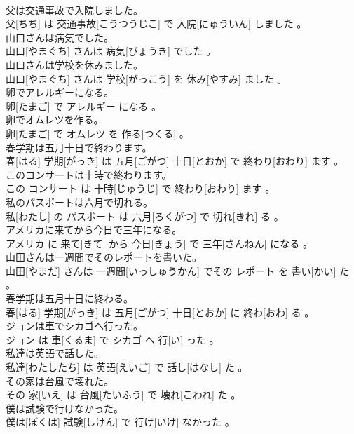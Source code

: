 \documentclass[8pt]{extreport}
\begin{document}
\begin{CJK}{UTF8}{min}
\\	父は交通事故で入院しました。	
\\	父[ちち] は 交通事故[こうつうじこ] で 入院[にゅういん] しました 。
\\	山口さんは病気でした。	
\\	山口[やまぐち] さんは 病気[びょうき] でした 。
\\	山口さんは学校を休みました。	
\\	山口[やまぐち] さんは 学校[がっこう] を 休み[やすみ] ました 。
\\	卵でアレルギーになる。	
\\	卵[たまご] で アレルギー になる 。
\\	卵でオムレツを作る。	
\\	卵[たまご] で オムレツ を 作る[つくる] 。
\\	春学期は五月十日で終わります。	
\\	春[はる] 学期[がっき] は 五月[ごがつ] 十日[とおか] で 終わり[おわり] ます 。
\\	このコンサートは十時で終わります。	
\\	この コンサート は 十時[じゅうじ] で 終わり[おわり] ます 。
\\	私のパスポートは六月で切れる。	
\\	私[わたし] の パスポート は 六月[ろくがつ] で 切れ[きれ] る 。
\\	アメリカに来てから今日で三年になる。	
\\	アメリカ に 来て[きて] から 今日[きょう] で 三年[さんねん] になる 。
\\	山田さんは一週間でそのレポートを書いた。	
\\	山田[やまだ] さんは 一週間[いっしゅうかん] でその レポート を 書い[かい] た 。
\\	春学期は五月十日に終わる。	
\\	春[はる] 学期[がっき] は 五月[ごがつ] 十日[とおか] に 終わ[おわ] る 。
\\	ジョンは車でシカゴへ行った。	
\\	ジョン は 車[くるま] で シカゴ へ 行[い] った 。
\\	私達は英語で話した。	
\\	私達[わたしたち] は 英語[えいご] で 話し[はなし] た 。
\\	その家は台風で壊れた。	
\\	その 家[いえ] は 台風[たいふう] で 壊れ[こわれ] た 。
\\	僕は試験で行けなかった。	
\\	僕は[ぼくは] 試験[しけん] で 行け[いけ] なかった 。

\end{CJK}
\end{document}
